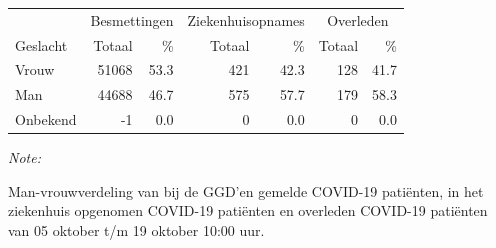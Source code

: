 \documentclass[
  english,
  man,floatsintext]{apa6}
\begin{document}
\begin{table}[H]
\centering\begingroup\fontsize{11}{13}\selectfont

\begin{threeparttable}
\begin{tabular}{lrrrrrr}
\toprule
\multicolumn{1}{c}{ } & \multicolumn{2}{c}{Besmettingen} & \multicolumn{2}{c}{Ziekenhuisopnames} & \multicolumn{2}{c}{Overleden} \\
\cmidrule(l{3pt}r{3pt}){2-3} \cmidrule(l{3pt}r{3pt}){4-5} \cmidrule(l{3pt}r{3pt}){6-7}
Geslacht & Totaal & \% & Totaal & \% & Totaal & \%\\
\midrule
Vrouw & 51068 & 53.3 & 421 & 42.3 & 128 & 41.7\\
Man & 44688 & 46.7 & 575 & 57.7 & 179 & 58.3\\
Onbekend & -1 & 0.0 & 0 & 0.0 & 0 & 0.0\\
\bottomrule
\end{tabular}
\begin{tablenotes}
\item \textit{Note: } 
\item Man-vrouwverdeling van bij de GGD’en gemelde COVID-19 patiënten, in het ziekenhuis opgenomen COVID-19 patiënten en overleden COVID-19 patiënten van 05 oktober t/m 19 oktober 10:00 uur.
\end{tablenotes}
\end{threeparttable}
\endgroup{}
\end{table}
\newpage
\end{document}
